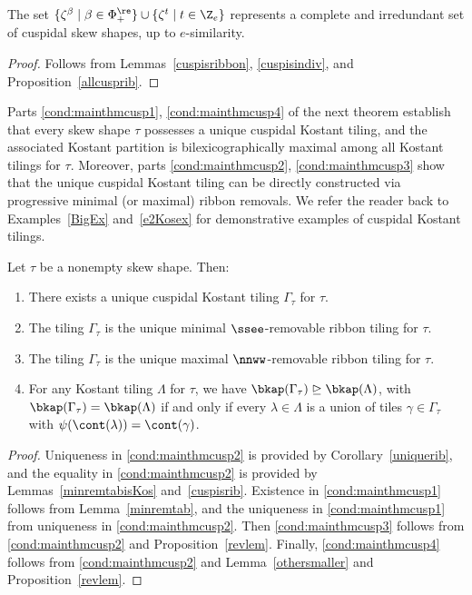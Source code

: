 \begin{theorem}\label{allcusp}
The set \(\{\zeta^{\beta} \mid \beta \in \Phi_+^\re\} \cup \{\zeta^t \mid t \in \Z_e\}\) represents a complete and irredundant set of cuspidal skew shapes, up to \(e\)-similarity.
\end{theorem}
\begin{proof}
Follows from Lemmas~\ref{cuspisribbon}, \ref{cuspisindiv}, and Proposition~\ref{allcusprib}.
\end{proof}

Parts \eqref{cond:mainthmcusp1}, \eqref{cond:mainthmcusp4} of the next theorem establish that every skew shape \(\tau\) possesses a unique cuspidal Kostant tiling, and the associated Kostant partition is bilexicographically maximal among all Kostant tilings for \(\tau\). Moreover, parts \eqref{cond:mainthmcusp2}, \eqref{cond:mainthmcusp3} show that the unique cuspidal Kostant tiling can be directly constructed via progressive minimal (or maximal) ribbon removals. We refer the reader back to Examples~\ref{BigEx} and~\ref{e2Kosex} for demonstrative examples of cuspidal Kostant tilings.


\begin{theorem}\label{mainthmcusp}
Let \(\tau\) be a nonempty skew shape. Then:
\begin{enumerate}
\item There exists a unique cuspidal Kostant tiling \(\Gamma_\tau\) for \(\tau\). \label{cond:mainthmcusp1}
\item The tiling \(\Gamma_\tau\) is the unique minimal \(\ssee\)-removable ribbon tiling for \(\tau\). \label{cond:mainthmcusp2}
\item The tiling \(\Gamma_\tau\) is the unique maximal \(\nnww\)-removable ribbon tiling for \(\tau\). \label{cond:mainthmcusp3}
\item For any Kostant tiling \(\Lambda\) for \(\tau\), we have \(\bkap(\Gamma_\tau) \trianglerighteq \bkap(\Lambda) \), with \(\bkap(\Gamma_\tau)=\bkap(\Lambda) \) if and only if every \(\lambda \in \Lambda\) is a union of tiles \(\gamma \in \Gamma_\tau\) with \(\psi(\cont(\lambda)) = \cont(\gamma)\). \label{cond:mainthmcusp4}
\end{enumerate}
\end{theorem}
\begin{proof}
Uniqueness in \eqref{cond:mainthmcusp2} is provided by Corollary~\ref{uniquerib}, and the equality in \eqref{cond:mainthmcusp2} is provided by Lemmas~\ref{minremtabisKos} and~\ref{cuspisrib}. Existence in \eqref{cond:mainthmcusp1} follows from Lemma~\ref{minremtab}, and the uniqueness in \eqref{cond:mainthmcusp1} from uniqueness in \eqref{cond:mainthmcusp2}. Then \eqref{cond:mainthmcusp3} follows from \eqref{cond:mainthmcusp2} and Proposition~\ref{revlem}. Finally, \eqref{cond:mainthmcusp4} follows from \eqref{cond:mainthmcusp2} and Lemma~\ref{othersmaller} and Proposition~\ref{revlem}.
\end{proof}

